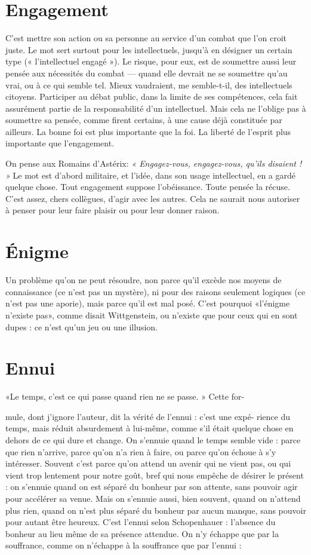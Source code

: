 \section{Engagement}
C'est mettre son action ou sa personne au service d’un
combat que l’on croit juste. Le mot sert surtout pour les
intellectuels, jusqu’à en désigner un certain type (« l’intellectuel engagé »). Le
risque, pour eux, est de soumettre aussi leur pensée aux nécessités du combat —
quand elle devrait ne se soumettre qu’au vrai, ou à ce qui semble tel. Mieux
vaudraient, me semble-t-il, des intellectuels citoyens. Participer au débat
public, dans la limite de ses compétences, cela fait assurément partie de la responsabilité
d’un intellectuel. Mais cela ne l’oblige pas à soumettre sa pensée,
comme firent certains, à une cause déjà constituée par ailleurs. La bonne foi est
plus importante que la foi. La liberté de l'esprit plus importante que l’engagement.

On pense aux Romains d’Astérix: {\it « Engagez-vous, engagez-vous, qu'ils
disaient ! »} Le mot est d’abord militaire, et l’idée, dans son usage intellectuel, en
a gardé quelque chose. Tout engagement suppose l’obéissance. Toute pensée la
récuse. C’est assez, chers collègues, d’agir avec les autres. Cela ne saurait nous
autoriser à penser pour leur faire plaisir ou pour leur donner raison.

\section{Énigme}
Un problème qu’on ne peut résoudre, non parce qu’il excède nos
moyens de connaissance (ce n’est pas un mystère), ni pour des raisons
seulement logiques (ce n’est pas une aporie), mais parce qu’il est mal posé.
C’est pourquoi «l’énigme n'existe pas», comme disait Wittgenstein, ou
n'existe que pour ceux qui en sont dupes : ce n’est qu’un jeu ou une illusion.

\section{Ennui}
«Le temps, c’est ce qui passe quand rien ne se passe. » Cette for-

mule, dont j'ignore l’auteur, dit la vérité de l'ennui : c’est une expé-
rience du temps, mais réduit absurdement à lui-même, comme s'il était
quelque chose en dehors de ce qui dure et change. On s’ennuie quand le temps
semble vide : parce que rien n'arrive, parce qu’on n’a rien à faire, ou parce
qu’on échoue à s’y intéresser. Souvent c’est parce qu’on attend un avenir qui ne
vient pas, ou qui vient trop lentement pour notre goût, bref qui nous empêche
de désirer le présent : on s'ennuie quand on est séparé du bonheur par son
attente, sans pouvoir agir pour accélérer sa venue. Mais on s’ennuie aussi, bien
souvent, quand on n'attend plus rien, quand on n’est plus séparé du bonheur
par aucun manque, sans pouvoir pour autant être heureux. C’est l’ennui selon
Schopenhauer : l'absence du bonheur au lieu même de sa présence attendue.
On n’y échappe que par la souffrance, comme on n’échappe à la souffrance que
par l'ennui :

